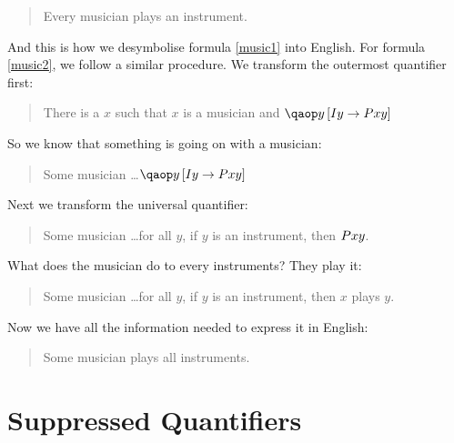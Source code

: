 \documentclass[PHIL101-Textbook.tex]{subfiles}
\begin{document}
\begin{quote}
  Every musician plays an instrument.
\end{quote} 

\noindent And this is how we desymbolise formula \ref{music1} into English.
For formula \ref{music2}, we follow a similar procedure.
We transform the outermost quantifier first:

\begin{quote}
  There is a $x$ such that $x$ is a musician and $\qab{y}{\atom I y \eif \atom P  xy }$
\end{quote}

\noindent So we know that something is going on with a musician:

\begin{quote}
  Some musician \dots $\qab{y}{\atom I y \eif \atom P  xy }$
\end{quote}

\noindent Next we transform the universal quantifier:

\begin{quote}
  Some musician \dots for all $y$, if $y$ is an instrument, then $\mathord{P}{x}y $. 
\end{quote}

\noindent What does the musician do to every instruments?
They play it:

\begin{quote}
  Some musician \dots for all $y$, if $y$ is an instrument, then $x$ plays $y$. 
\end{quote}  

\noindent Now we have all the information needed to express it in English:

\begin{quote}
  Some musician plays all instruments. 
\end{quote} 



\section{Suppressed Quantifiers}
\end{document}
